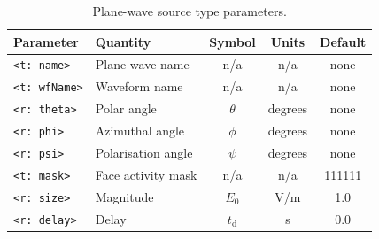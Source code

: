 \documentclass[onecolumn,a4paper]{article}
\numberwithin{equation}{section}
\begin{document}
\begin{table}[ht]
\begin{center}
\begin{tabular}{|l|l|c|c|c|}
\hline
Parameter            &Quantity           &Symbol         &Units   &Default \\ 
\hline
\texttt{<t:~name>}   &Plane-wave name    &n/a            &n/a     &none    \\
\texttt{<t:~wfName>} &Waveform name      &n/a            &n/a     &none    \\
\texttt{<r:~theta>}  &Polar angle        &$\theta$       &degrees &none    \\
\texttt{<r:~phi>}    &Azimuthal angle    &$\phi$         &degrees &none    \\
\texttt{<r:~psi>}    &Polarisation angle &$\psi$         &degrees &none    \\
\texttt{<t:~mask>}   &Face activity mask &n/a            &n/a     &111111  \\
\texttt{<r:~size>}   &Magnitude          &$E_0$          &V/m     &1.0     \\
\texttt{<r:~delay>}  &Delay              &$t_\mathrm{d}$ &s       &0.0     \\ 
\hline
\end{tabular}
\caption{\label{tb:pwparm}Plane-wave source type parameters.}
\end{center}
\end{table}
\end{document}
